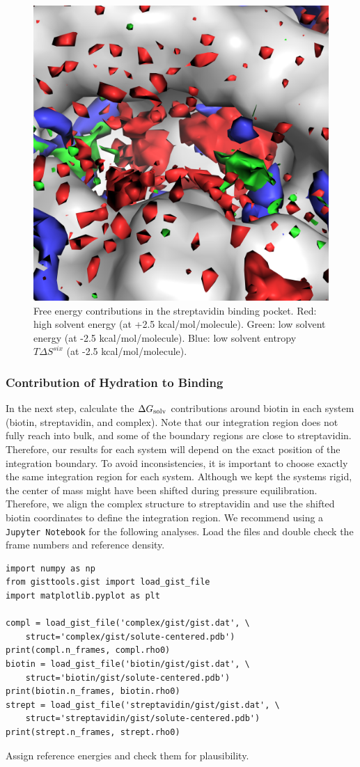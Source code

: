 \documentclass[9pt,tutorial]{livecoms}
\newcommand{\dgsolv}{\Delta G_\textup{solv}}
\newcommand{\software}{\texttt}
\begin{document}
\begin{figure}
	\centering
	\includegraphics[width=0.8\linewidth]{figures/binding_pocket_norm_quants.png}
	\caption{Free energy contributions in the streptavidin binding pocket. Red: high solvent energy (at +2.5 
	kcal/mol/molecule). Green: low solvent energy (at -2.5 kcal/mol/molecule). Blue: low solvent entropy $T\Delta S^{six}$ 
	(at -2.5 kcal/mol/molecule).}\label{fig_binding_pocket_pymol}
\end{figure}

\subsubsection{Contribution of Hydration to Binding}
\label{sec:binding_contributions}
In the next step, calculate the $\dgsolv$ contributions around biotin in each system (biotin, streptavidin, and complex).
Note that our integration region does not fully reach into bulk, and some of the boundary regions are close to streptavidin. 
Therefore, our results for each system will depend on the exact position of the integration boundary. 
To avoid inconsistencies, it is important to choose exactly the same integration region for each system.
Although we kept the systems rigid, the center of mass might have been shifted during pressure equilibration.
Therefore, we align the complex structure to streptavidin and use the shifted biotin coordinates to define the integration region.
We recommend using a \software{Jupyter Notebook} for the following analyses.
Load the files and double check the frame numbers and reference density.
\begin{lstlisting}[style=python]
import numpy as np
from gisttools.gist import load_gist_file
import matplotlib.pyplot as plt

compl = load_gist_file('complex/gist/gist.dat', \
    struct='complex/gist/solute-centered.pdb')
print(compl.n_frames, compl.rho0)
biotin = load_gist_file('biotin/gist/gist.dat', \
    struct='biotin/gist/solute-centered.pdb')
print(biotin.n_frames, biotin.rho0)
strept = load_gist_file('streptavidin/gist/gist.dat', \
    struct='streptavidin/gist/solute-centered.pdb')
print(strept.n_frames, strept.rho0)
\end{lstlisting}
Assign reference energies and check them for plausibility.
\end{document}
